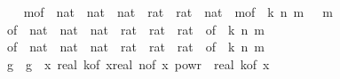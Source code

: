 \begin{isabellebody}
\ \ \isamarkupfalse%
\ m{\isacharunderscore}{\kern0pt}of\ {\isacharcolon}{\kern0pt}{\isacharcolon}{\kern0pt}\ {\isachardoublequoteopen}nat\ {\isasymtimes}\ nat\ {\isasymtimes}\ nat\ {\isasymtimes}\ rat\ {\isasymtimes}\ rat\ {\isasymRightarrow}\ nat{\isachardoublequoteclose}\ \ {\isachardoublequoteopen}m{\isacharunderscore}{\kern0pt}of\ {\isacharequal}{\kern0pt}\ {\isacharparenleft}{\kern0pt}{\isasymlambda}{\isacharparenleft}{\kern0pt}k{\isacharcomma}{\kern0pt}\ n{\isacharcomma}{\kern0pt}\ m{\isacharcomma}{\kern0pt}\ {\isasymepsilon}{\isacharcomma}{\kern0pt}\ {\isasymdelta}{\isacharparenright}{\kern0pt}{\isachardot}{\kern0pt}\ m{\isacharparenright}{\kern0pt}{\isachardoublequoteclose}\isanewline
\ \ \isamarkupfalse%
\ {\isasymepsilon}{\isacharunderscore}{\kern0pt}of\ {\isacharcolon}{\kern0pt}{\isacharcolon}{\kern0pt}\ {\isachardoublequoteopen}nat\ {\isasymtimes}\ nat\ {\isasymtimes}\ nat\ {\isasymtimes}\ rat\ {\isasymtimes}\ rat\ {\isasymRightarrow}\ rat{\isachardoublequoteclose}\ \ {\isachardoublequoteopen}{\isasymepsilon}{\isacharunderscore}{\kern0pt}of\ {\isacharequal}{\kern0pt}\ {\isacharparenleft}{\kern0pt}{\isasymlambda}{\isacharparenleft}{\kern0pt}k{\isacharcomma}{\kern0pt}\ n{\isacharcomma}{\kern0pt}\ m{\isacharcomma}{\kern0pt}\ {\isasymepsilon}{\isacharcomma}{\kern0pt}\ {\isasymdelta}{\isacharparenright}{\kern0pt}{\isachardot}{\kern0pt}\ {\isasymepsilon}{\isacharparenright}{\kern0pt}{\isachardoublequoteclose}\isanewline
\ \ \isamarkupfalse%
\ {\isasymdelta}{\isacharunderscore}{\kern0pt}of\ {\isacharcolon}{\kern0pt}{\isacharcolon}{\kern0pt}\ {\isachardoublequoteopen}nat\ {\isasymtimes}\ nat\ {\isasymtimes}\ nat\ {\isasymtimes}\ rat\ {\isasymtimes}\ rat\ {\isasymRightarrow}\ rat{\isachardoublequoteclose}\ \ {\isachardoublequoteopen}{\isasymdelta}{\isacharunderscore}{\kern0pt}of\ {\isacharequal}{\kern0pt}\ {\isacharparenleft}{\kern0pt}{\isasymlambda}{\isacharparenleft}{\kern0pt}k{\isacharcomma}{\kern0pt}\ n{\isacharcomma}{\kern0pt}\ m{\isacharcomma}{\kern0pt}\ {\isasymepsilon}{\isacharcomma}{\kern0pt}\ {\isasymdelta}{\isacharparenright}{\kern0pt}{\isachardot}{\kern0pt}\ {\isasymdelta}{\isacharparenright}{\kern0pt}{\isachardoublequoteclose}\isanewline
\isanewline
\ \ \isamarkupfalse%
\ g{}\ \ {\isachardoublequoteopen}g{}\ {\isacharequal}{\kern0pt}\ {\isacharparenleft}{\kern0pt}{\isasymlambda}x{\isachardot}{\kern0pt}\ real\ {\isacharparenleft}{\kern0pt}k{\isacharunderscore}{\kern0pt}of\ x{\isacharparenright}{\kern0pt}{\isacharasterisk}{\kern0pt}{\isacharparenleft}{\kern0pt}real\ {\isacharparenleft}{\kern0pt}n{\isacharunderscore}{\kern0pt}of\ x{\isacharparenright}{\kern0pt}{\isacharparenright}{\kern0pt}\ powr\ {\isacharparenleft}{\kern0pt}{}{\isacharminus}{\kern0pt}{}{\isacharslash}{\kern0pt}\ real\ {\isacharparenleft}{\kern0pt}k{\isacharunderscore}{\kern0pt}of\ x{\isacharparenright}{\kern0pt}{\isacharparenright}{\kern0pt}\ {\isacharslash}{\kern0pt}\ \isanewline

\end{isabellebody}
